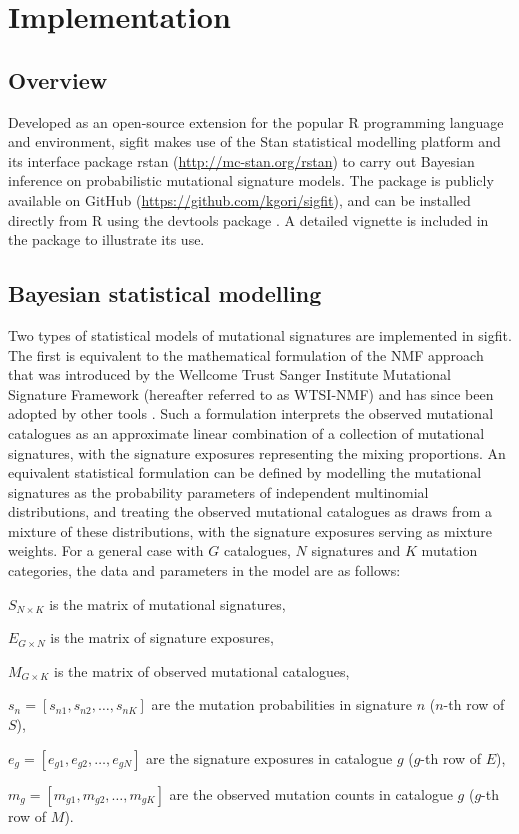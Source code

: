 \section*{Implementation}
\subsection*{Overview}
Developed as an open-source extension for the popular R programming language and environment, sigfit makes use of the Stan \citep{stanMain} statistical modelling platform and its interface package rstan (\url{http://mc-stan.org/rstan}) to carry out Bayesian inference on probabilistic mutational signature models. The package is publicly available on GitHub (\url{https://github.com/kgori/sigfit}), and can be installed directly from R using the devtools package \cite{devtools}. A detailed vignette is included in the package to illustrate its use.


\subsection*{Bayesian statistical modelling}
\label{ssec:bsm}
Two types of statistical models of mutational signatures are implemented in sigfit. The first is equivalent to the mathematical formulation of the NMF approach that was introduced by the Wellcome Trust Sanger Institute Mutational Signature Framework \cite{AlexandrovCellRep2013} (hereafter referred to as WTSI-NMF) and has since been adopted by other tools \cite{Baez-Ortega2017}. Such a formulation interprets the observed mutational catalogues as an approximate linear combination of a collection of mutational signatures, with the signature exposures representing the mixing proportions. An equivalent statistical formulation can be defined by modelling the mutational signatures as the probability parameters of independent multinomial distributions, and treating the observed mutational catalogues as draws from a mixture of these distributions, with the signature exposures serving as mixture weights. For a general case with $G$ catalogues, $N$ signatures and $K$ mutation categories, the data and parameters in the model are as follows:

\begin{indented}
\setlength{\parindent}{0pt}

$S_{N \times K}$ is the matrix of mutational signatures,

$E_{G \times N}$ is the matrix of signature exposures,

$M_{G \times K}$ is the matrix of observed mutational catalogues,

$s_n = [s_{n1}, s_{n2}, \dots, s_{nK}]$ are the mutation probabilities in signature $n$ ($n$-th row of $S$),

$e_g = [e_{g1}, e_{g2}, \dots, e_{gN}]$ are the signature exposures in catalogue $g$ ($g$-th row of $E$),

$m_g = [m_{g1}, m_{g2}, \dots, m_{gK}]$ are the observed mutation counts in catalogue $g$ ($g$-th row of $M$).

\end{indented}

